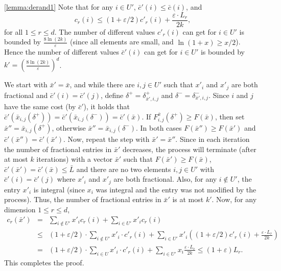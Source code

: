 \documentclass[11pt]{article}
\newcommand{\eps}{\varepsilon}
\newcommand{\bx}{\bar{x}}
\newcommand{\bL}{\bar{L}}
\newcommand{\bc}{\bar{c}}
\newenvironment{dl_proof}[1]{\noindent{\bf Proof of Lemma #1:}}{
 \hspace*{\fill} $\Box$ \vskip \belowdisplayskip}
\begin{document}
{\begin{dl_proof}{\ref{lemma:derand1}}
Note that for any $i\in U'$, $\bc'(i)\leq \bc(i)$, and
$$c_r(i)\leq (1+\eps /2) c'_r(i) + \frac{\eps \cdot L_r}{2k},$$
for all $1 \leq r \leq d$.
The number of different values $c'_r(i)$ can get for $i\in U'$
is bounded by $\frac{8 \ln (2k) }{\eps}$ (since all elements are
small, and $\ln(1+x) \geq x/2$). Hence the number of different
values $\bc'(i)$ can get for $i\in U'$ is bounded by
$k'= \left( \frac{8 \ln (2k) }{\eps} \right) ^d$.

We start with $\bx'=\bx$, and while there are $i,j \in U'$ such that $x'_i$ and $x'_j$ are both
fractional and $\bc'(i)=\bc'(j)$, define $\delta^{+} = \delta_{\bx',i,j}^{+}$
and $\delta^{-}=\delta_{\bx',i,j}^{-}$.
Since $i$ and $j$ have the same cost (by $\bc'$), it holds that
$\bc' \left( \bx_{i,j}(\delta^{+}) \right) =
\bc' \left( \bx_{i,j}(\delta^{-}) \right) =\bc'(\bx)$.
If $F^{\bx}_{i,j}(\delta^{+})\geq F(\bx)$,
then set $\bx''= \bx_{i,j}(\delta^{+})$, otherwise $\bx''= \bx_{i,j}(\delta^{-})$.
In both cases $F(\bx'')\geq F(\bx')$ and $\bc'(\bx'')= \bc'(\bx')$. Now, repeat
the step with $\bx'=\bx''$.
Since in each iteration the number of fractional entries in $\bx'$ decreases,
 the process will terminate (after at most $k$ iterations)
with a vector $\bx'$ such that $F(\bx')\geq F(\bx)$,
$\bc'(\bx')=\bc'(\bx)\leq \bL$
and there are no two elements $i,j\in U'$ with $\bc'(i)=\bc'(j)$ where
$x'_i$ and $x'_j$ are both fractional. Also, for any $i\notin U'$, the entry
$x'_i$ is integral (since $x_i$ was integral and the entry was not modified by
the process). Thus, the number of fractional entries in $\bx'$ is
at most $k'$.
Now, for any dimension $1 \leq r \leq d$,
\begin{eqnarray*}
c_r(\bx')&=& \sum_{i\notin U'} x'_i c_r(i) + \sum_{i\in U'} x'_i c_r(i) \\
&\leq&
(1+\eps/2) \cdot \sum_{i\notin U'} x'_i  \cdot c'_r(i) +
   \sum_{i\in U'} x'_i \left( (1+\eps/2) c'_r(i) + \frac{\eps \cdot L_r}{2k} \right)\\
&=&
(1+\eps/2) \cdot \sum_{i\in U} x'_i  \cdot c'_r(i) +
   \sum_{i\in U'} x_i \frac{\eps \cdot L_r}{2k} \leq (1+\eps) L_r.
\end{eqnarray*}
This completes the proof.
\end{dl_proof}

}
\end{document}
